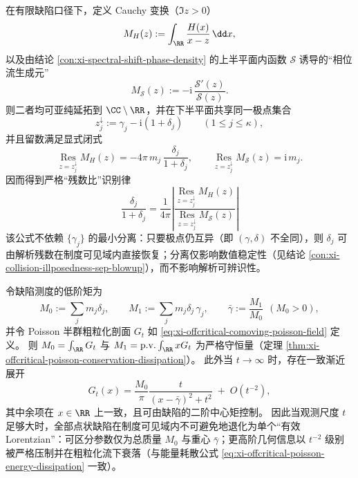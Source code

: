 \begin{proposition}\label{con:xi-double-residue-ratio-delta}
在有限缺陷口径下，定义 Cauchy 变换（\(\Im z>0\)）
\[
M_H(z):=\int_{\RR}\frac{H(x)}{x-z}\,\dd x,
\]
以及由结论 \ref{con:xi-spectral-shift-phase-density} 的上半平面内函数 \(\mathcal{S}\) 诱导的“相位流生成元”
\[
M_{\mathcal{S}}(z):=-\mathrm{i}\,\frac{\mathcal{S}'(z)}{\mathcal{S}(z)}.
\]
则二者均可亚纯延拓到 \(\CC\setminus\RR\)，并在下半平面共享同一极点集合
\[
z_j^{\downarrow}:=\gamma_j-\mathrm{i}(1+\delta_j)\qquad(1\le j\le \kappa),
\]
并且留数满足显式闭式
\[
\operatorname*{Res}_{z=z_j^{\downarrow}}M_H(z)
=-4\pi\,m_j\,\frac{\delta_j}{1+\delta_j},
\qquad
\operatorname*{Res}_{z=z_j^{\downarrow}}M_{\mathcal{S}}(z)
=\mathrm{i}\,m_j.
\]
因而得到严格“残数比”识别律
\[
\boxed{\;
\frac{\delta_j}{1+\delta_j}
=
\frac{1}{4\pi}\left|
\frac{\operatorname*{Res}_{z=z_j^{\downarrow}}M_H(z)}
{\operatorname*{Res}_{z=z_j^{\downarrow}}M_{\mathcal{S}}(z)}
\right|\;}
\]
该公式不依赖 \(\{\gamma_j\}\) 的最小分离：只要极点仍互异（即 \((\gamma,\delta)\) 不全同），则 \(\delta_j\) 可由解析残数在制度可见域内直接恢复；分离仅影响数值稳定性（见结论 \ref{con:xi-collision-illposedness-sep-blowup}），而不影响解析可辨识性。
\end{proposition}

\begin{proposition}\label{con:xi-poisson-coarsegraining-nohair}
令缺陷测度的低阶矩为
\[
M_0:=\sum_{j}m_j\delta_j,
\qquad
M_1:=\sum_{j}m_j\delta_j\,\gamma_j,
\qquad
\bar\gamma:=\frac{M_1}{M_0}\ \ (M_0>0),
\]
并令 Poisson 半群粗粒化剖面 \(G_t\) 如 \eqref{eq:xi-offcritical-comoving-poisson-field} 定义。
则 \(M_0=\int_{\RR}G_t\) 与 \(M_1=\mathrm{p.v.}\int_{\RR}xG_t\) 为严格守恒量（定理 \ref{thm:xi-offcritical-poisson-conservation-dissipation}）。
此外当 \(t\to\infty\) 时，存在一致渐近展开
\[
G_t(x)
=
\frac{M_0}{\pi}\frac{t}{(x-\bar\gamma)^2+t^2}
\;+\;O(t^{-2}),
\]
其中余项在 \(x\in\RR\) 上一致，且可由缺陷的二阶中心矩控制。
因此当观测尺度 \(t\) 足够大时，全部点状缺陷在制度可见域内不可避免地退化为单个“有效 Lorentzian”：可区分参数仅为总质量 \(M_0\) 与重心 \(\bar\gamma\)；更高阶几何信息以 \(t^{-2}\) 级别被严格压制并在粗粒化流下衰落（与能量耗散公式 \eqref{eq:xi-offcritical-poisson-energy-dissipation} 一致）。
\end{proposition}

